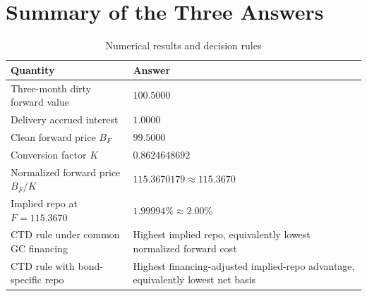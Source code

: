 \documentclass[11pt]{article}
\numberwithin{equation}{section}
\begin{document}
\section*{Summary of the Three Answers}
\begin{table}[H]
\centering
\caption{Numerical results and decision rules}
\small
\begin{tabularx}{\textwidth}{@{}L{3.4cm}Y@{}}
\toprule{}\textbf{Quantity} & \textbf{Answer}\\\midrule
Three-month dirty forward value & $100.5000$\\
Delivery accrued interest & $1.0000$\\
Clean forward price $B_F$ & $99.5000$\\
Conversion factor $K$ & $0.8624648692$\\
Normalized forward price $B_F/K$ & $115.3670179\approx115.3670$\\
Implied repo at $F=115.3670$ & $1.99994\%\approx2.00\%$\\
CTD rule under common GC financing & Highest implied repo, equivalently lowest normalized forward cost\\
CTD rule with bond-specific repo & Highest financing-adjusted implied-repo advantage, equivalently lowest net basis\\
\bottomrule
\end{tabularx}
\end{table}
\end{document}
